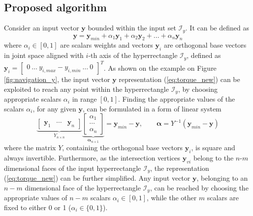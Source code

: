 \subsection{Proposed algorithm}
Consider an input vector $\bm{y}$ bounded within the input set $\mathcal{I}_y$. It can be defined as
\begin{equation}
    \bm{y} = {\bm{y}}_{min} + \alpha_1 \bm{y}_1+ \alpha_2 \bm{y}_2 + ... + \alpha_n \bm{y}_n
    \label{eq:torque_new}
\end{equation}
where $\alpha_i \in [0,1]$ are scalars weights and vectors $\bm{y}_i$ are orthogonal base vectors in joint space aligned with $i$-th axis of the hyperrectangle $\mathcal{I}_y$, defined as $\bm{y}_i = \begin{bmatrix} 0~\ldots~y_{i,max} - y_{i,min}~\ldots~0 \end{bmatrix}^T$. As shown on the example on Figure \ref{fig:navigation_y}, the input vector $\bm{y}$ representation (\ref{eq:torque_new}) can be exploited to reach any point within the hyperrectangle $\mathcal{I}_y$, by choosing appropriate scalars $\alpha_i$ in range $[0,1]$. Finding the appropriate values of the scalars $\alpha_i$, for any given $\bm{y}$, can be formulated in a form of linear system
\begin{equation}
\underbrace{\begin{bmatrix}
    \bm{y}_1&\cdots&\bm{y}_n
\end{bmatrix}}_{Y_{n\times n}}\underbrace{\begin{bmatrix}
    \alpha_1\\
    \cdots\\
    \alpha_n
\end{bmatrix}}_{\bm{\alpha}_{n\times 1}} = \bm{y}_{min} - \bm{y}, \qquad  \bm{\alpha} = Y^{-1}(\bm{y}_{min} - \bm{y})
\label{eq:define_Y_Alpha}
\end{equation}
where the matrix $Y$, containing the orthogonal base vectors $\bm{y}_i$, is square and always invertible. 
Furthermore, as the intersection vertices $\bm{y}_{vi}$ belong to the $n$-$m$ dimensional faces of the input hyperrectangle $\mathcal{I}_y$, the representation (\ref{eq:torque_new}) can be further simplified. Any input vector $\bm{y}$, belonging to an $n-m$ dimensional face of the hyperrectangle $\mathcal{I}_y$, can be reached by choosing the appropriate values of $n-m$ scalars $\alpha_i\in[0,1]$, while the other $m$ scalars are fixed to either 0 or 1 ($\alpha_i\in\{0,1\}$).

